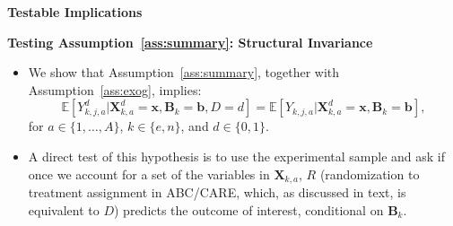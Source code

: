 \documentclass[static]{JJH-Beamer}
\begin{document}
{}
\begin{frame}

\hypertarget{creamcheese}{}
\begin{center}
\textbf{Testable Implications}
\end{center}

\end{frame}

\begin{frame}

\begin{block}{}
\begin{center}
\textbf{Testing Assumption~\ref{ass:summary}: Structural Invariance}
\end{center}
\end{block}

\end{frame}

\begin{frame}

\begin{itemize}
\item We show that Assumption~\ref{ass:summary}, together with Assumption~\ref{ass:exog}, implies:
    \begin{equation}\label{eq:invariancetestapp}
    \mathbb{E} \left[ Y_{k,j,a}^d | \bm{X}_{k,a}^d  = \bm{x}, \bm{B}_k = \bm{b}, D = d \right] = \mathbb{E} \left[ Y_{k,j,a} | \bm{X}^d_{k,a}  = \bm{x}, \bm{B}_k = \bm{b} \right],
    \end{equation}
    for $a \in \{1,\dots,A\}$, $k \in \{e,n\}$, and $d \in \{0,1\}$.
\end{itemize}

\end{frame}

\begin{frame}

\begin{itemize}
\item A direct test of this hypothesis is to use the experimental sample and ask if once we account for a set of the variables in $\bm{X}_{k,a}$, $R$ (randomization to treatment assignment in ABC/CARE, which, as discussed in text, is equivalent to $D$) predicts the outcome of interest, conditional on $\bm{B}_k$.
\end{itemize}

\end{frame}
\end{document}
